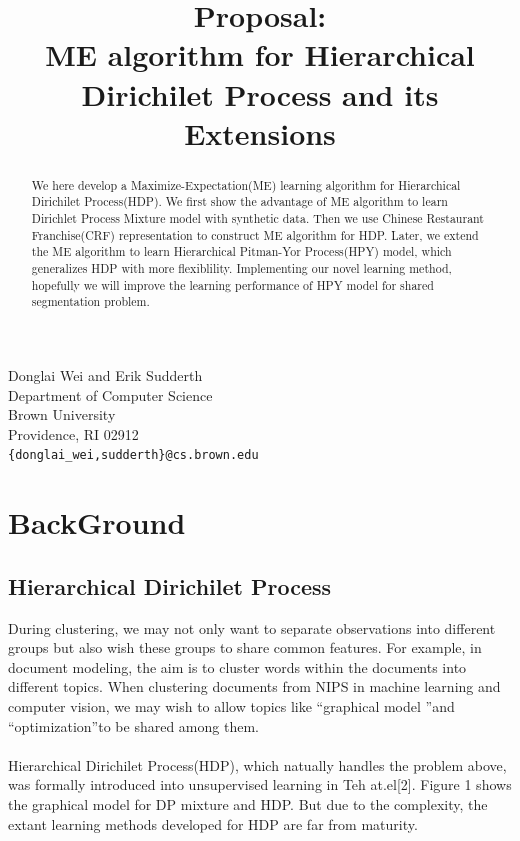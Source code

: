 \documentclass{article}
\title{Proposal:\\ME algorithm for Hierarchical Dirichilet Process and its Extensions}
\author{}
\begin{document}
Donglai Wei and Erik Sudderth \\
Department of Computer Science\\
Brown University\\
Providence, RI 02912 \\
\texttt{\{donglai\_wei,sudderth\}@cs.brown.edu} \\

\makeanontitle

\begin{abstract}We here develop a  Maximize-Expectation(ME) learning algorithm for Hierarchical Dirichilet Process(HDP).
 We first show the advantage of ME algorithm to learn Dirichlet Process Mixture model with synthetic data. 
Then we use Chinese Restaurant Franchise(CRF) representation to construct ME algorithm for HDP. 
Later, we extend the ME algorithm to learn Hierarchical Pitman-Yor Process(HPY) model, which generalizes HDP with more flexiblility. 
Implementing our novel learning method, hopefully we will improve the learning performance of HPY model for shared segmentation problem.

\end{abstract}

\section{BackGround}
\subsection{Hierarchical Dirichilet Process}
During clustering, we may not only want to separate observations into different groups but also wish these groups to share common features. 
For example, in document modeling, the aim is to cluster words within the documents into different topics. 
When clustering documents from NIPS in machine learning and  computer vision, 
we may wish to allow topics like \textquotedblleft graphical model \textquotedblright and \textquotedblleft optimization\textquotedblright to be shared among them. 
\\ \\
Hierarchical Dirichilet Process(HDP), which natually handles the problem above, was formally introduced into unsupervised learning in Teh at.el[2].
Figure 1 shows the graphical model for DP mixture and HDP. But due to the complexity, the extant learning methods developed for HDP are far from maturity.
\end{document}
